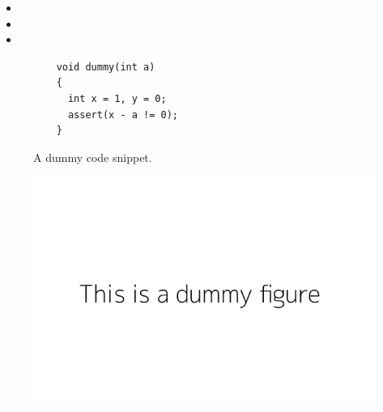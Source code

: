 \documentclass[]{ccdsexam}
\begin{document}
\begin{questions}


\question \lipsum[1][1]



\question[25] \lipsum[1][1-3]

\begin{itemize}
  \item \lipsum[2][1]
  \item \lipsum[2][2]
  \item \lipsum[2][3]
\end{itemize}

\lipsum[1][4-6]
\droppoints

\begin{figure}[ht]
  \begin{verbatim}
    void dummy(int a)
    {
      int x = 1, y = 0;
      assert(x - a != 0);
    }
  \end{verbatim}
  \caption{A dummy code snippet.}\label{fig:test}
\end{figure}

\begin{figure}[ht]
  \centering
  \includegraphics[width=.5\textwidth]{dummy}
  \caption{}
\end{figure}


\end{questions}
\end{document}
